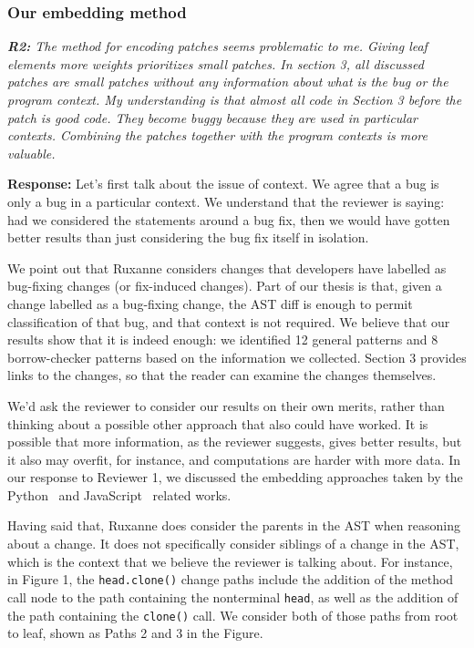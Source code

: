 \documentclass{article}
\begin{document}
\subsubsection{\label{rev:2:embedding}Our embedding method}

\textit{\textbf{R2:} The method for encoding patches seems problematic to me. Giving leaf elements more weights prioritizes small patches. In section 3, all discussed patches are small patches without any information about what is the bug or the program context. My understanding is that almost all code in Section 3 before the patch is good code. They become buggy because they are used in particular contexts. Combining the patches together with the program contexts is more valuable.}

\vspace*{1em} \noindent \textbf{Response:} Let's first talk about the issue of context. We agree that a bug is only a bug in a particular context. We understand that the reviewer is saying: had we considered the statements around a bug fix, then we would have gotten better results than just considering the bug fix itself in isolation. 

We point out that Ruxanne considers changes that developers have labelled as bug-fixing changes (or fix-induced changes). Part of our thesis is that, given a change labelled as a bug-fixing change, the AST diff is enough to permit classification of that bug, and that context is not required. We believe that our results show that it is indeed enough: we identified 12 general patterns and 8 borrow-checker patterns based on the information we collected.  Section 3 provides links to the changes, so that the reader can examine the changes themselves. 

We'd ask the reviewer to consider our results on their own merits, rather than thinking about a possible other approach that also could have worked. It is possible that more information, as the reviewer suggests, gives better results, but it also may overfit, for instance, and computations are harder with more data. In our response to Reviewer 1, we discussed the embedding approaches taken by the Python~\cite{yang2022mining} and JavaScript~\cite{hanam2016discovering} related works.

Having said that, Ruxanne does consider the parents in the AST when reasoning about a change. It does not specifically consider siblings of a change in the AST, which is the context that we believe the reviewer is talking about. For instance, in Figure 1, the \verb+head.clone()+ change paths include the addition of the method call node to the path containing the nonterminal \verb+head+, as well as the addition of the path containing the \verb+clone()+ call. We consider both of those paths from root to leaf, shown as Paths 2 and 3 in the Figure.
\end{document}
